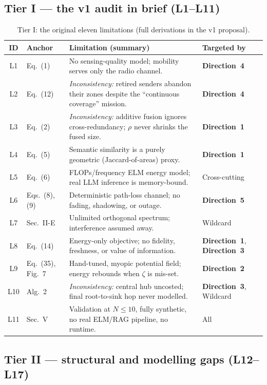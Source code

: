 \documentclass[11pt,a4paper]{article}
\newcommand{\Dir}[1]{\textcolor{accent}{\textbf{Direction~#1}}}
\begin{document}
\subsection{Tier I --- the v1 audit in brief (L1--L11)}
\begin{table}[h]
\centering\footnotesize
\renewcommand{\arraystretch}{1.25}
\begin{tabular}{@{}c l p{8.6cm} l@{}}
\toprule
\textbf{ID} & \textbf{Anchor} & \textbf{Limitation (summary)} & \textbf{Targeted by} \\
\midrule
L1 & Eq.~(1) & No sensing-quality model; mobility serves only the radio channel. & \Dir{4} \\
L2 & Eq.~(12) & \emph{Inconsistency:} retired senders abandon their zones despite the ``continuous coverage'' mission. & \Dir{4} \\
L3 & Eq.~(2) & \emph{Inconsistency:} additive fusion ignores cross-redundancy; $\rho$ never shrinks the fused size. & \Dir{1} \\
L4 & Eq.~(5) & Semantic similarity is a purely geometric (Jaccard-of-areas) proxy. & \Dir{1} \\
L5 & Eq.~(6) & FLOPs/frequency ELM energy model; real LLM inference is memory-bound. & Cross-cutting \\
L6 & Eqs.~(8),(9) & Deterministic path-loss channel; no fading, shadowing, or outage. & \Dir{5} \\
L7 & Sec.~II-E & Unlimited orthogonal spectrum; interference assumed away. & Wildcard \\
L8 & Eq.~(14) & Energy-only objective; no fidelity, freshness, or value of information. & \Dir{1}, \Dir{3} \\
L9 & Eq.~(35), Fig.~7 & Hand-tuned, myopic potential field; energy rebounds when $\zeta$ is mis-set. & \Dir{2} \\
L10 & Alg.~2 & \emph{Inconsistency:} central hub uncosted; final root-to-sink hop never modelled. & \Dir{3}, Wildcard \\
L11 & Sec.~V & Validation at $N\le 10$, fully synthetic, no real ELM/RAG pipeline, no runtime. & All \\
\bottomrule
\end{tabular}
\caption{Tier I: the original eleven limitations (full derivations in the v1 proposal).}
\label{tab:tier1}
\end{table}

\subsection{Tier II --- structural and modelling gaps (L12--L17)}
\end{document}
